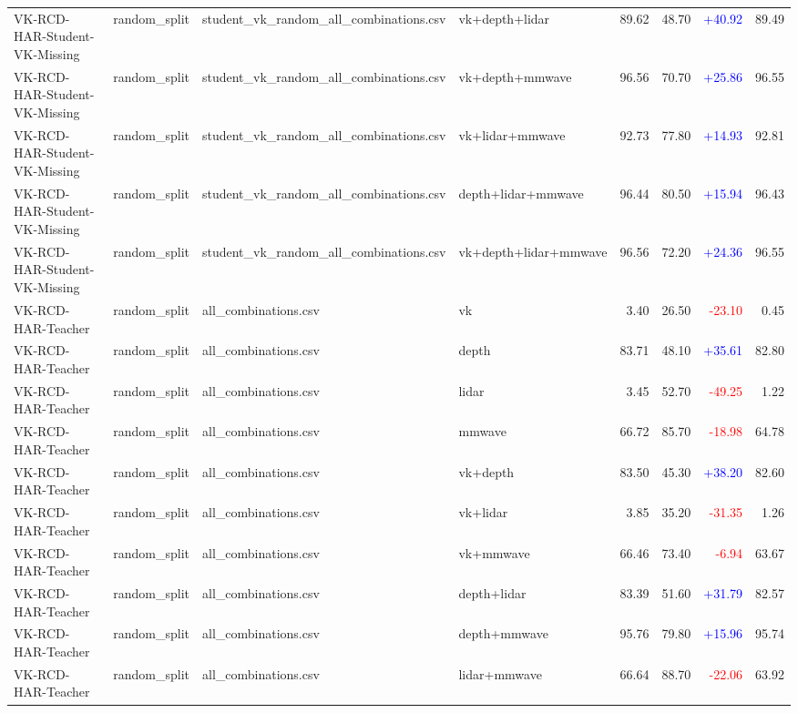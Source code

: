 \documentclass[10pt]{article}
\begin{document}
\begin{longtable}{llllrrrr}
VK-RCD-HAR-Student-VK-Missing & random\_split & student\_vk\_random\_all\_combinations.csv & vk+depth+lidar & 89.62 & 48.70 & \textcolor{blue}{+40.92} & 89.49\\
VK-RCD-HAR-Student-VK-Missing & random\_split & student\_vk\_random\_all\_combinations.csv & vk+depth+mmwave & 96.56 & 70.70 & \textcolor{blue}{+25.86} & 96.55\\
VK-RCD-HAR-Student-VK-Missing & random\_split & student\_vk\_random\_all\_combinations.csv & vk+lidar+mmwave & 92.73 & 77.80 & \textcolor{blue}{+14.93} & 92.81\\
VK-RCD-HAR-Student-VK-Missing & random\_split & student\_vk\_random\_all\_combinations.csv & depth+lidar+mmwave & 96.44 & 80.50 & \textcolor{blue}{+15.94} & 96.43\\
VK-RCD-HAR-Student-VK-Missing & random\_split & student\_vk\_random\_all\_combinations.csv & vk+depth+lidar+mmwave & 96.56 & 72.20 & \textcolor{blue}{+24.36} & 96.55\\
VK-RCD-HAR-Teacher & random\_split & all\_combinations.csv & vk & 3.40 & 26.50 & \textcolor{red}{-23.10} & 0.45\\
VK-RCD-HAR-Teacher & random\_split & all\_combinations.csv & depth & 83.71 & 48.10 & \textcolor{blue}{+35.61} & 82.80\\
VK-RCD-HAR-Teacher & random\_split & all\_combinations.csv & lidar & 3.45 & 52.70 & \textcolor{red}{-49.25} & 1.22\\
VK-RCD-HAR-Teacher & random\_split & all\_combinations.csv & mmwave & 66.72 & 85.70 & \textcolor{red}{-18.98} & 64.78\\
VK-RCD-HAR-Teacher & random\_split & all\_combinations.csv & vk+depth & 83.50 & 45.30 & \textcolor{blue}{+38.20} & 82.60\\
VK-RCD-HAR-Teacher & random\_split & all\_combinations.csv & vk+lidar & 3.85 & 35.20 & \textcolor{red}{-31.35} & 1.26\\
VK-RCD-HAR-Teacher & random\_split & all\_combinations.csv & vk+mmwave & 66.46 & 73.40 & \textcolor{red}{-6.94} & 63.67\\
VK-RCD-HAR-Teacher & random\_split & all\_combinations.csv & depth+lidar & 83.39 & 51.60 & \textcolor{blue}{+31.79} & 82.57\\
VK-RCD-HAR-Teacher & random\_split & all\_combinations.csv & depth+mmwave & 95.76 & 79.80 & \textcolor{blue}{+15.96} & 95.74\\
VK-RCD-HAR-Teacher & random\_split & all\_combinations.csv & lidar+mmwave & 66.64 & 88.70 & \textcolor{red}{-22.06} & 63.92\\

\end{longtable}
\end{document}
